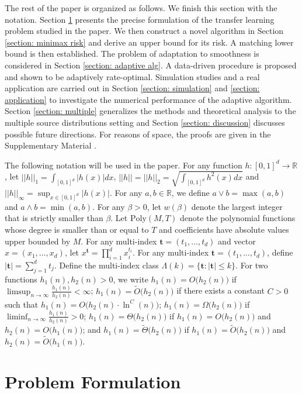 \documentclass{article}
\def\R{\mathbb{R}}
\def\O{{O}}
\def\t{\textbf{t}}
\begin{document}
The rest of the paper is organized as follows. We finish this section with the notation. Section \ref{section: problem formulation} presents the precise formulation of the transfer learning problem studied in the paper. We then construct a novel algorithm in Section \ref{section: minimax risk} and derive an upper bound for its risk. A matching lower bound is then established.   The problem of adaptation to smoothness is considered  in Section \ref{section: adaptive alg}. A data-driven procedure is proposed and shown to be adaptively rate-optimal. Simulation studies and a real application are carried out in Section \ref{section: simulation} and \ref{section: application} to investigate the numerical performance of the adaptive algorithm. Section \ref{section: multiple} generalizes the methods and theoretical analysis to the multiple source distributions setting and Section \ref{section: discussion} discusses possible future directions.  For reasons of space, the proofs  are given in the Supplementary Material \citep{CaiPu}.

The following notation will be used in the paper. For any function $h:[0,1]^d \rightarrow \R$, let $||h||_1=\int_{[0,1]^d} |h(x)|dx $, $||h||=||h||_2=\sqrt{\int_{[0,1]^d}h^2(x)dx}$ and $||h||_\infty=\sup_{x\in [0,1]^d}|h(x)|$.
For any $a, b \in \R$, we define $a\vee b= \max(a,b)$ and $a\wedge b = \min(a,b)$. For any $\beta>0$, let $w(\beta)$ denote the largest integer that is strictly smaller than $\beta$. Let $\text{Poly}(M, T)$ denote the polynomial functions whose degree is smaller than or equal to $T$ and  coefficients have absolute values upper bounded by $M$. For any multi-index $\t=(t_1,\dots,t_d)$ and  vector $x=(x_1,\dots,x_d)$, let $x^{\t}=\prod_{i=1}^d x_i^{t_i}$. For any multi-index $\t=(t_1,\dots,t_d)$, define $|\t|=\sum_{j=1}^d t_j$. Define the multi-index class $\Lambda(k)=\{\t:|\t|\leq k\}$.
For two functions $h_1(n), h_2(n)>0$, we write $h_1(n)=\O\big(h_2(n)\big)$ if $\limsup_{n\rightarrow \infty}\frac{h_1(n)}{h_2(n)}<\infty$;  $h_1(n)=\tilde{\O}\big(h_2(n)\big)$ if there exists a constant $C>0$ such that $h_1(n)=\O\big(h_2(n)\cdot \ln^{C}(n)\big)$; 
$h_1(n)=\Omega\big(h_2(n)\big)$ if  $\liminf_{n\rightarrow \infty}\frac{h_1(n)}{h_2(n)}>0$; $h_1(n)=\Theta\big(h_2(n)\big)$ if $h_1(n)=\O\big(h_2(n)\big)$ and $h_2(n)=\O\big(h_1(n)\big)$; and $h_1(n)=\tilde{\Theta}\big(h_2(n)\big)$ if $h_1(n)=\tilde{\O}\big(h_2(n)\big)$ and $h_2(n)=\tilde{\O}\big(h_1(n)\big)$. 

\section{Problem Formulation}
\label{section: problem formulation}
\end{document}

